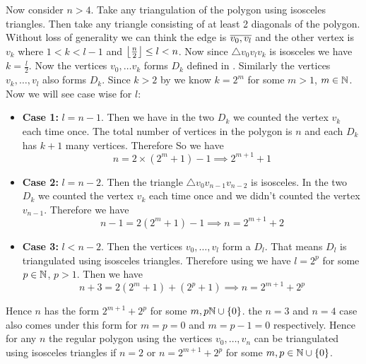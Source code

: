 \documentclass[a4paper, 11pt]{article}
\begin{document}
{\begin{itemize}[label=$\bullet$]
\begin{itemize}
Now consider $n>4$. Take any triangulation of the polygon using isosceles triangles. Then take  any triangle consisting of at least 2 diagonals of the polygon. Without loss of generality we can think the edge is $\overline{v_0,v_l}$ and the other vertex is $v_k$ where $1<k<l-1$ and $\left\lfloor\frac{n}2\right\rfloor\leq l< n$. Now since $\triangle v_0v_lv_k$ is isosceles we have $k=\frac{l}2$. Now the vertices $v_0,\dots  v_k$ forms $D_{k}$ defined in . Similarly the vertices $v_k,\dots, v_l$ also forms $D_k$. Since $k>2$ by  we know $k=2^m$ for some $m>1$, $m\in\mathbb{N}$.  Now we will see case wise for $l$:\begin{itemize}
	\item \textbf{Case 1:} $l=n-1$. Then we have in the two $D_k$ we counted the vertex $v_k$ each time once. The total number of vertices in the polygon is $n$ and each $D_k$ has $k+1$ many vertices. Therefore So we have $$n=2\times (2^m+1)-1\implies 2^{m+1}+1$$
	\item \textbf{Case 2:} $l=n-2$. Then the triangle $\triangle v_0v_{n-1}v_{n-2}$ is isosceles. In the two $D_k$ we counted the vertex $v_k$ each time once and we didn't counted the vertex $v_{n-1}$. Therefore we have $$n-1=2(2^m+1)-1\implies n=2^{m+1}+2$$
	\item \textbf{Case 3:} $l<n-2$. Then the vertices $v_0,\dots, v_l$ form a $D_l$. That means $D_l$ is triangulated using isosceles triangles. Therefore using  we have $l=2^p$ for some $p\in\mathbb{N}$, $p>1$. Then we have $$n+3=2(2^m+1)+(2^p+1)\implies n=2^{m+1}+2^p$$
\end{itemize}
Hence $n$ has the form $2^{m+1}+2^p$ for some $m,p\mathbb{N}\cup \{0\}$. the $n=3$ and $n=4$ case also comes under this form for $m=p=0$ and $m=p-1=0$ respectively. Hence for any $n$ the regular polygon using the vertices $v_0,\dots, v_n$ can be triangulated using isosceles triangles if $n=2$ or $n=2^{m+1}+2^p$ for some $m,p\in\mathbb{N}\cup\{0\}$.


\end{itemize}
\end{itemize}}
\end{document}
